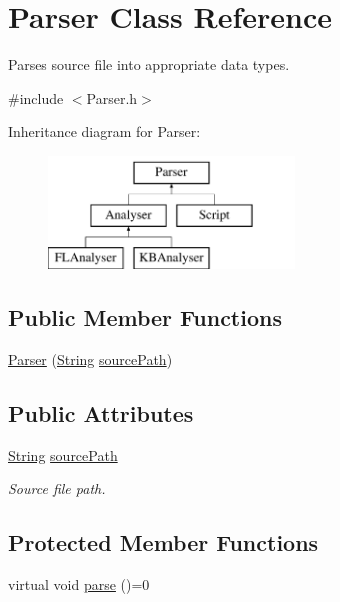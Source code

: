 \hypertarget{classParser}{}\section{Parser Class Reference}
\label{classParser}


Parses source file into appropriate data types.  




{\ttfamily \#include $<$Parser.\+h$>$}

Inheritance diagram for Parser\+:\begin{figure}[H]
\begin{center}
\leavevmode
\includegraphics[height=3.000000cm]{classParser}
\end{center}
\end{figure}
\subsection*{Public Member Functions}
\begin{DoxyCompactItemize}
\item 
\mbox{\hyperlink{classParser_a0561a18255812c46ece89f199ce337a8}{Parser}} (\mbox{\hyperlink{classString}{String}} \mbox{\hyperlink{classParser_a9af73d63c4685837209f362dababa554}{source\+Path}})
\end{DoxyCompactItemize}
\subsection*{Public Attributes}
\begin{DoxyCompactItemize}
\item 
\mbox{\label{classParser_a9af73d63c4685837209f362dababa554}} 
\mbox{\hyperlink{classString}{String}} \mbox{\hyperlink{classParser_a9af73d63c4685837209f362dababa554}{source\+Path}}
\begin{DoxyCompactList}\small\item\em Source file path. \end{DoxyCompactList}\end{DoxyCompactItemize}
\subsection*{Protected Member Functions}
\begin{DoxyCompactItemize}
\item 
virtual void \mbox{\hyperlink{classParser_a1df9aa58be0f4027a39277d78b870195}{parse}} ()=0
\end{DoxyCompactItemize}


